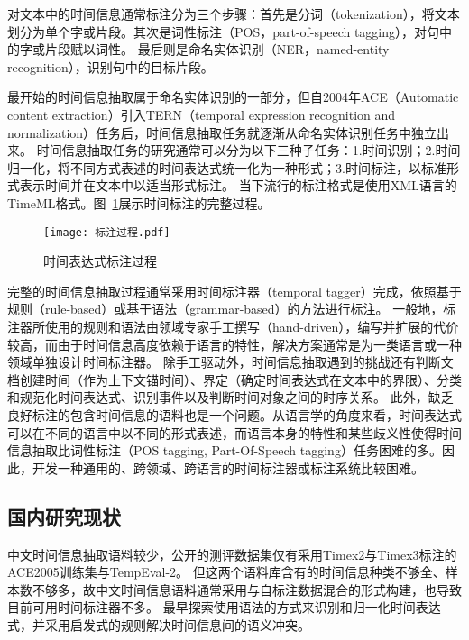 对文本中的时间信息通常标注分为三个步骤：首先是分词（tokenization），将文本划分为单个字或片段。其次是词性标注（POS，part-of-speech tagging），对句中的字或片段赋以词性。
最后则是命名实体识别（NER，named-entity recognition），识别句中的目标片段。

最开始的时间信息抽取属于命名实体识别的一部分，但自2004年ACE\cite{doddington2004automatic}（Automatic content extraction）引入TERN（temporal expression recognition and normalization）任务后，时间信息抽取任务就逐渐从命名实体识别任务中独立出来。
时间信息抽取任务的研究通常可以分为以下三种子任务：1.时间识别；2.时间归一化，将不同方式表述的时间表达式统一化为一种形式；3.时间标注，以标准形式表示时间并在文本中以适当形式标注。
当下流行的标注格式是使用XML语言的TimeML\cite{pustejovsky2003timeml}格式。图~\ref{fig:tagging_pregress}展示时间标注的完整过程。

\begin{figure}[h]
    \centering
    \texttt{[image: 标注过程.pdf]}
    \caption{时间表达式标注过程}
    \label{fig:tagging_pregress}
\end{figure}

完整的时间信息抽取过程通常采用时间标注器（temporal tagger）完成，依照基于规则（rule-based）或基于语法（grammar-based）的方法进行标注。
一般地，标注器所使用的规则和语法由领域专家手工撰写（hand-driven），编写并扩展的代价较高，而由于时间信息高度依赖于语言的特性，解决方案通常是为一类语言或一种领域单独设计时间标注器。
除手工驱动外，时间信息抽取遇到的挑战还有判断文档创建时间（作为上下文锚时间）、界定（确定时间表达式在文本中的界限）、分类和规范化时间表达式、识别事件以及判断时间对象之间的时序关系。
此外，缺乏良好标注的包含时间信息的语料也是一个问题。从语言学的角度来看，时间表达式可以在不同的语言中以不同的形式表述，而语言本身的特性和某些歧义性使得时间信息抽取比词性标注（POS tagging, Part-Of-Speech tagging）任务困难的多。因此，开发一种通用的、跨领域、跨语言的时间标注器或标注系统比较困难。


\subsection{国内研究现状}

中文时间信息抽取语料较少，公开的测评数据集仅有采用Timex2与Timex3标注的ACE2005训练集与TempEval-2。
但这两个语料库含有的时间信息种类不够全、样本数不够多，故中文时间信息语料通常采用与自标注数据混合的形式构建，也导致目前可用时间标注器不多。
\citet{mingli2005ctemp}最早探索使用语法的方式来识别和归一化时间表达式，并采用启发式的规则解决时间信息间的语义冲突。

